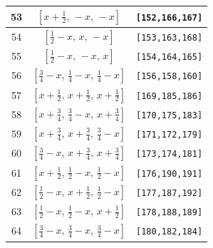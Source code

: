 \documentclass[fleqn,8pt]{jsarticle}
\begin{document}
\begin{longtable}{ccc}
53 & $\left[ x + \frac{1}{2},\, - x,\, - x \right]$ & {\tt [152,166,167]} \\ \hline
54 & $\left[ \frac{1}{2} - x,\, x,\, - x \right]$ & {\tt [153,163,168]} \\ \hline
55 & $\left[ \frac{1}{2} - x,\, - x,\, x \right]$ & {\tt [154,164,165]} \\ \hline
56 & $\left[ \frac{3}{4} - x,\, \frac{1}{4} - x,\, \frac{1}{4} - x \right]$ & {\tt [156,158,160]} \\ \hline
57 & $\left[ x + \frac{1}{2},\, x + \frac{1}{2},\, x + \frac{1}{2} \right]$ & {\tt [169,185,186]} \\ \hline
58 & $\left[ x + \frac{3}{4},\, \frac{3}{4} - x,\, x + \frac{3}{4} \right]$ & {\tt [170,175,183]} \\ \hline
59 & $\left[ x + \frac{3}{4},\, x + \frac{3}{4},\, \frac{3}{4} - x \right]$ & {\tt [171,172,179]} \\ \hline
60 & $\left[ \frac{3}{4} - x,\, x + \frac{3}{4},\, x + \frac{3}{4} \right]$ & {\tt [173,174,181]} \\ \hline
61 & $\left[ x + \frac{1}{2},\, \frac{1}{2} - x,\, \frac{1}{2} - x \right]$ & {\tt [176,190,191]} \\ \hline
62 & $\left[ \frac{1}{2} - x,\, x + \frac{1}{2},\, \frac{1}{2} - x \right]$ & {\tt [177,187,192]} \\ \hline
63 & $\left[ \frac{1}{2} - x,\, \frac{1}{2} - x,\, x + \frac{1}{2} \right]$ & {\tt [178,188,189]} \\ \hline
64 & $\left[ \frac{3}{4} - x,\, \frac{3}{4} - x,\, \frac{3}{4} - x \right]$ & {\tt [180,182,184]} \\
\end{longtable}
\renewcommand{\arraystretch}{1.2}
\end{document}
